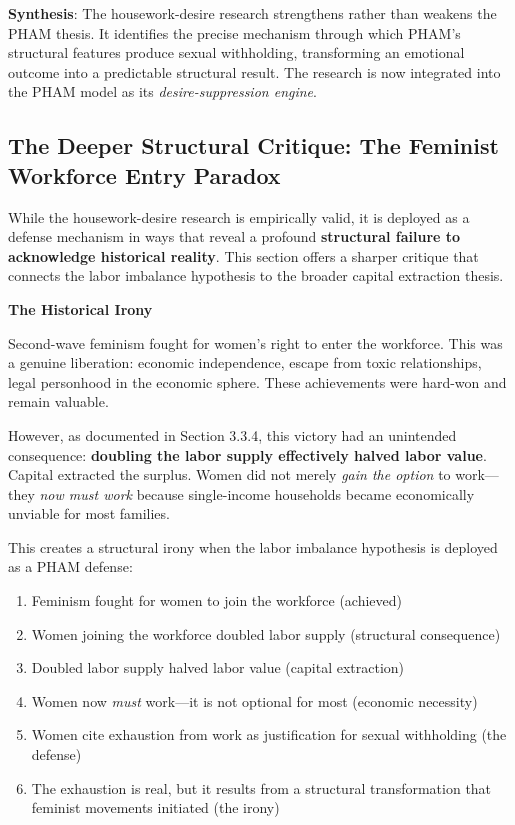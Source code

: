 \documentclass[12pt,openany]{book}
\numberwithin{equation}{chapter}
\begin{document}
\textbf{Synthesis}: The housework-desire research strengthens rather than weakens the PHAM thesis. It identifies the precise mechanism through which PHAM's structural features produce sexual withholding, transforming an emotional outcome into a predictable structural result. The research is now integrated into the PHAM model as its \textit{desire-suppression engine}.

\subsection{The Deeper Structural Critique: The Feminist Workforce Entry Paradox}

While the housework-desire research is empirically valid, it is deployed as a defense mechanism in ways that reveal a profound \textbf{structural failure to acknowledge historical reality}. This section offers a sharper critique that connects the labor imbalance hypothesis to the broader capital extraction thesis.

\textbf{The Historical Irony}

Second-wave feminism fought for women's right to enter the workforce. This was a genuine liberation: economic independence, escape from toxic relationships, legal personhood in the economic sphere. These achievements were hard-won and remain valuable.

However, as documented in Section 3.3.4, this victory had an unintended consequence: \textbf{doubling the labor supply effectively halved labor value}. Capital extracted the surplus. Women did not merely \textit{gain the option} to work---they \textit{now must work} because single-income households became economically unviable for most families.

This creates a structural irony when the labor imbalance hypothesis is deployed as a PHAM defense:

\begin{enumerate}
    \item Feminism fought for women to join the workforce (achieved)
    \item Women joining the workforce doubled labor supply (structural consequence)
    \item Doubled labor supply halved labor value (capital extraction)
    \item Women now \textit{must} work---it is not optional for most (economic necessity)
    \item Women cite exhaustion from work as justification for sexual withholding (the defense)
    \item The exhaustion is real, but it results from a structural transformation that feminist movements initiated (the irony)
\end{enumerate}
\end{document}
